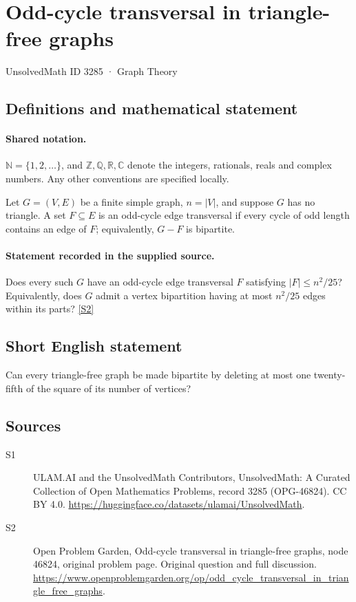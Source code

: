 \documentclass[11pt]{article}
\newcommand{\sref}[2]{\hyperlink{source:#1:#2}{[S#2]}}
\begin{document}
\setcounter{section}{3284}
\section{Odd-cycle transversal in triangle-free graphs}\label{3285}
{\small\sffamily UnsolvedMath ID 3285 · Graph Theory}
\subsection{Definitions and mathematical statement}

\paragraph{Shared notation.}$\mathbb N=\{1,2,\ldots\}$, and $\mathbb Z,\mathbb Q,\mathbb R,\mathbb C$ denote the integers, rationals, reals and complex numbers. Any other conventions are specified locally.


Let $G=(V,E)$ be a finite simple graph, $n=|V|$, and suppose $G$ has no triangle. A set $F\subseteq E$ is an odd-cycle edge transversal if every cycle of odd length contains an edge of $F$; equivalently, $G-F$ is bipartite.
\paragraph{Statement recorded in the supplied source.}
Does every such $G$ have an odd-cycle edge transversal $F$ satisfying $|F|\leq n^2/25$? Equivalently, does $G$ admit a vertex bipartition having at most $n^2/25$ edges within its parts? \sref{3285}{2}
\subsection{Short English statement}
Can every triangle-free graph be made bipartite by deleting at most one twenty-fifth of the square of its number of vertices?
\subsection{Sources}
\begin{description}
\item[\hypertarget{source:3285:1}{S1}] ULAM.AI and the UnsolvedMath Contributors, UnsolvedMath: A Curated Collection of Open Mathematics Problems, record 3285 (OPG-46824). CC BY 4.0. \url{https://huggingface.co/datasets/ulamai/UnsolvedMath}.
\item[\hypertarget{source:3285:2}{S2}] Open Problem Garden, Odd-cycle transversal in triangle-free graphs, node 46824, original problem page. Original question and full discussion. \url{https://www.openproblemgarden.org/op/odd_cycle_transversal_in_triangle_free_graphs}.

\end{description}
\label{end:3285}
\end{document}
